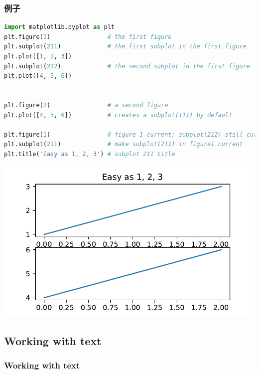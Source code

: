 \documentclass[UTF8,a4paper,12pt]{ctexart}  %
\begin{document}
\hypertarget{ux4f8bux5b50}{%
\subsubsection{例子}\label{ux4f8bux5b50}}

\begin{lstlisting}[language=Python]
import matplotlib.pyplot as plt
plt.figure(1)                # the first figure
plt.subplot(211)             # the first subplot in the first figure
plt.plot([1, 2, 3])
plt.subplot(212)             # the second subplot in the first figure
plt.plot([4, 5, 6])


plt.figure(2)                # a second figure
plt.plot([4, 5, 6])          # creates a subplot(111) by default

plt.figure(1)                # figure 1 current; subplot(212) still current
plt.subplot(211)             # make subplot(211) in figure1 current
plt.title('Easy as 1, 2, 3') # subplot 211 title
\end{lstlisting}

\begin{center}\includegraphics[width=0.9\linewidth]{python-visualization_files/figure-latex/unnamed-chunk-15-1} \end{center}

\hypertarget{working-with-text}{%
\subsection{Working with text}\label{working-with-text}}

\hypertarget{working-with-text-1}{%
\subsubsection{Working with text}\label{working-with-text-1}}
\end{document}
